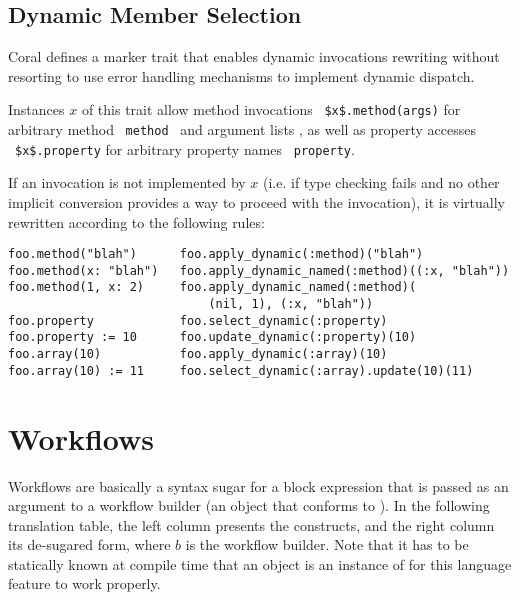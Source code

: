 \subsection{Dynamic Member Selection}
\label{sec:dynamic-member-selection}

Coral defines a marker trait  that enables dynamic invocations rewriting without resorting to use error handling mechanisms to implement dynamic dispatch. 

Instances $x$ of this trait allow method invocations ~\lstinline[deletekeywords={method}]!$x$.method(args)! for arbitrary method ~\lstinline[deletekeywords={method}]!method!~ and argument lists , as well as property accesses ~\lstinline[deletekeywords={property}]!$x$.property! for arbitrary property names ~\lstinline[deletekeywords={property}]!property!. 

If an invocation is not implemented by $x$ (i.e. if type checking fails and no other implicit conversion provides a way to proceed with the invocation), it is virtually rewritten according to the following rules:

\begin{lstlisting}[deletekeywords={property,method}]
foo.method("blah")      foo.apply_dynamic(:method)("blah")
foo.method(x: "blah")   foo.apply_dynamic_named(:method)((:x, "blah"))
foo.method(1, x: 2)     foo.apply_dynamic_named(:method)(
                            (nil, 1), (:x, "blah"))
foo.property            foo.select_dynamic(:property)
foo.property := 10      foo.update_dynamic(:property)(10)
foo.array(10)           foo.apply_dynamic(:array)(10)
foo.array(10) := 11     foo.select_dynamic(:array).update(10)(11)
\end{lstlisting}






\section{Workflows}
\label{sec:workflows}

Workflows are basically a syntax sugar for a block expression that is passed as an argument to a workflow builder (an object that conforms to ). In the following translation table, the left column presents the constructs, and the right column its de-sugared form, where $b$ is the workflow builder. Note that it has to be statically known at compile time that an object is an instance of  for this language feature to work properly.

